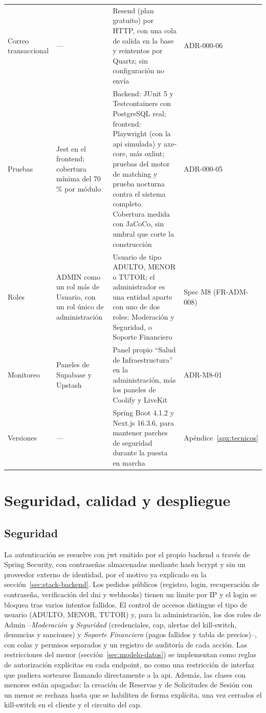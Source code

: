 {\begin{xltabular}{\textwidth}{>{\raggedright\arraybackslash}p{2.6cm} >{\raggedright\arraybackslash}p{3.1cm} L >{\raggedright\arraybackslash}p{2.3cm}}
    Correo transaccional & --- & Resend (plan gratuito) por HTTP, con una cola de salida en la base y reintentos por Quartz; sin configuración no envía & ADR-000-06 \\
    Pruebas & Jest en el frontend; cobertura mínima del 70\,\% por módulo & Backend: JUnit 5 y Testcontainers con PostgreSQL real; frontend: Playwright (con la \gls{api} simulada) y axe-core, más oxlint; pruebas del motor de \gls{matching} y prueba nocturna contra el sistema completo. Cobertura medida con JaCoCo, sin umbral que corte la construcción & ADR-000-05 \\
    Roles & ADMIN como un rol más de Usuario, con un rol único de administración & Usuario de tipo ADULTO, MENOR o TUTOR; el administrador es una entidad aparte con uno de dos roles: Moderación y Seguridad, o Soporte Financiero & Spec M8 (FR-ADM-008) \\
    Monitoreo & Paneles de Supabase y Upstash & Panel propio ``Salud de Infraestructura'' en la administración, más los paneles de Coolify y LiveKit & ADR-M8-01 \\
    Versiones & --- & Spring Boot 4.1.2 y Next.js 16.3.6, para mantener parches de seguridad durante la puesta en marcha & Apéndice~\ref{apx:tecnicos} \\
\end{xltabular}
}

\section{Seguridad, calidad y despliegue}

\subsection{Seguridad}\label{sec:seguridad}

La autenticación se resuelve con \gls{jwt} emitido por el propio backend
a través de Spring Security, con contraseñas almacenadas mediante hash
bcrypt y sin un proveedor externo de identidad, por el motivo ya
explicado en la sección~\ref{sec:stack-backend}. Los pedidos públicos
(registro, login, recuperación de contraseña, verificación del \gls{dni} y
webhooks) tienen un límite por IP y el login se bloquea tras varios
intentos fallidos. El control de accesos distingue el tipo de usuario
(ADULTO, MENOR, TUTOR) y, para la administración, los dos roles de Admin
--\emph{Moderación y Seguridad} (credenciales, \gls{cap}, alertas del
kill-switch, denuncias y sanciones) y \emph{Soporte Financiero} (pagos
fallidos y tabla de precios)--, con colas y permisos
separados y un registro de auditoría de cada acción. Las restricciones del
menor (sección~\ref{sec:modelo-datos}) se implementan como reglas de
autorización explícitas en cada endpoint, no como una restricción de
interfaz que pudiera sortearse llamando directamente a la \gls{api}.
Además, las clases con menores están apagadas:
la creación de Reservas y de Solicitudes de Sesión con un menor se
rechaza hasta que se habiliten de forma explícita, una vez cerrados el
kill-switch en el cliente y el circuito del \gls{cap}.

